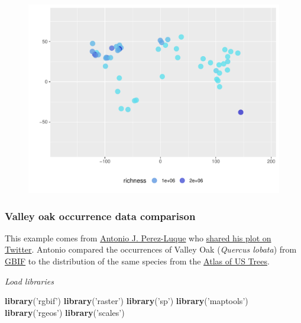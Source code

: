 \documentclass[author-year, review, 11pt]{components/elsarticle} %
\makeatletter
\newenvironment{Shaded}{\begin{snugshade}}{\end{snugshade}}
\newcommand{\KeywordTok}[1]{\textcolor[rgb]{0.13,0.29,0.53}{\textbf{{#1}}}}
\newcommand{\StringTok}[1]{\textcolor[rgb]{0.31,0.60,0.02}{{#1}}}
\newcommand{\NormalTok}[1]{{#1}}
\def\maxwidth{\ifdim\Gin@nat@width>\linewidth\linewidth
\else\Gin@nat@width\fi}
\let\Oldincludegraphics\includegraphics
\renewcommand{\includegraphics}[1]{\Oldincludegraphics[width=\maxwidth]{#1}}
\makeatother
\begin{document}
\begin{figure}[htbp]
\centering
\includegraphics{components/figure/manuscript-unnamed-chunk-30-1.pdf}
\caption{}
\end{figure}

\subsubsection{Valley oak occurrence data
comparison}\label{valley-oak-occurrence-data-comparison}

This example comes from \href{https://twitter.com/ajpelu}{Antonio J.
Perez-Luque} who
\href{https://twitter.com/ajpelu/status/473951167567757312}{shared his
plot on Twitter}. Antonio compared the occurrences of Valley Oak
(\emph{Quercus lobata}) from \href{http://www.gbif.org/}{GBIF} to the
distribution of the same species from the
\href{http://esp.cr.usgs.gov/data/little/}{Atlas of US Trees}.

\emph{Load libraries}

\begin{Shaded}
\begin{Highlighting}[]
\KeywordTok{library}\NormalTok{(}\StringTok{'rgbif'}\NormalTok{)}
\KeywordTok{library}\NormalTok{(}\StringTok{'raster'}\NormalTok{)}
\KeywordTok{library}\NormalTok{(}\StringTok{'sp'}\NormalTok{)}
\KeywordTok{library}\NormalTok{(}\StringTok{'maptools'}\NormalTok{)}
\KeywordTok{library}\NormalTok{(}\StringTok{'rgeos'}\NormalTok{)}
\KeywordTok{library}\NormalTok{(}\StringTok{'scales'}\NormalTok{)}
\end{Highlighting}
\end{Shaded}
\end{document}
